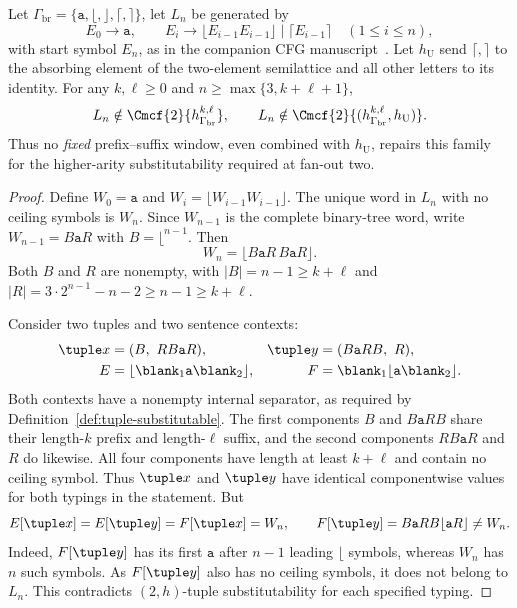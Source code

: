 
\begin{proposition}
\label{prop:fixed-window-doubling-fanout-two}
Let $\Gamma_{\mathrm{br}}=\{\mathtt a,\lfloor,\rfloor,\lceil,\rceil\}$,
let $L_n$ be generated by
\[
 E_0\to\mathtt a,\qquad
 E_i\to\lfloor E_{i-1}E_{i-1}\rfloor
       \mid\lceil E_{i-1}\rceil\quad(1\le i\le n),
\]
with start symbol $E_n$, as in the companion CFG
manuscript~\cite{kuriyamaCFG}.
Let $h_{\mathrm U}$ send $\lceil,\rceil$ to the absorbing
element of the two-element semilattice and all other letters
to its identity.
For any $k,\ell\ge0$ and
$n\ge\max\{3,k+\ell+1\}$,
\[
 L_n\notin\Cmcf{2}{h_{\Gamma_{\mathrm{br}}}^{k,\ell}},
 \qquad
 L_n\notin\Cmcf{2}{(h_{\Gamma_{\mathrm{br}}}^{k,\ell},h_{\mathrm U})}.
\]
Thus no \emph{fixed} prefix--suffix window, even combined with
$h_{\mathrm U}$, repairs this family for the higher-arity
substitutability required at fan-out two.
\end{proposition}
\begin{proof}
Define $W_0=\mathtt a$ and
$W_i=\lfloor W_{i-1}W_{i-1}\rfloor$.
The unique word in $L_n$ with no ceiling symbols is $W_n$.
Since $W_{n-1}$ is the complete binary-tree word, write
$W_{n-1}=B\mathtt a R$ with
$B=\lfloor^{n-1}$.
Then
\[
 W_n=\lfloor B\mathtt a R\,B\mathtt a R\rfloor.
\]
Both $B$ and $R$ are nonempty, with
$|B|=n-1\ge k+\ell$ and
$|R|=3\cdot2^{n-1}-n-2\ge n-1\ge k+\ell$.

Consider two tuples and two sentence contexts:
\[
 \begin{aligned}
 \tuple x&=(B,\ R B\mathtt a R),&
 \tuple y&=(B\mathtt a R B,\ R),\\
 E&=\lfloor\blank_1\mathtt a\blank_2\rfloor,&
 F&=\blank_1\lfloor\mathtt a\blank_2\rfloor.
 \end{aligned}
\]
Both contexts have a nonempty internal separator, as
required by Definition~\ref{def:tuple-substitutable}.
The first components $B$ and $B\mathtt a R B$ share
their length-$k$ prefix and length-$\ell$ suffix,
and the second components $R B\mathtt a R$ and $R$
do likewise. All four components have length at least
$k+\ell$ and contain no ceiling symbol.
Thus $\tuple x$ and $\tuple y$ have identical
componentwise values for both typings in the statement.
But
\[
 E[\tuple x]=E[\tuple y]=F[\tuple x]=W_n,
 \qquad
 F[\tuple y]=B\mathtt a R B\lfloor\mathtt a R\rfloor
 \ne W_n.
\]
Indeed, $F[\tuple y]$ has its first $\mathtt a$
after $n-1$ leading $\lfloor$ symbols, whereas
$W_n$ has $n$ such symbols.
As $F[\tuple y]$ also has no ceiling symbols,
it does not belong to $L_n$.
This contradicts $(2,h)$-tuple substitutability
for each specified typing.
\end{proof}

